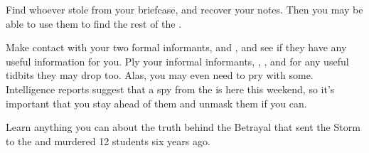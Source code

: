 \documentclass[char]{GL2020}
\begin{document}
\begin{itemz}
    \item Find whoever stole \iFolderOfNotes{} from your briefcase, and recover your notes. Then you may be able to use them to find the rest of the \pGoaties{}.
    \item Make contact with your two formal informants, \cEthics{} and \cAssistantScientist{}, and see if they have any useful information for you. Ply your informal informants, \cPrincipal{}, \cHistory{}, and \cChupInventor{} for any useful tidbits they may drop too. Alas, you may even need to pry with \cPirate{} some. Intelligence reports suggest that a spy from the \pFarm{} is here this weekend, so it's important that you stay ahead of them and unmask them if you can.
    \item Learn anything you can about the truth behind the Betrayal that sent the Storm to the \pShip{} and murdered 12 students six years ago.
\end{itemz}
\end{document}
